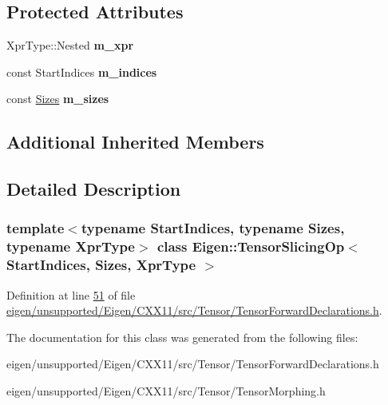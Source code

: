 \subsection*{Protected Attributes}
\begin{DoxyCompactItemize}
\item 
\mbox{\label{class_eigen_1_1_tensor_slicing_op_a1b9219e58825c297a38ff691ccf25f19}} 
Xpr\+Type\+::\+Nested {\bfseries m\+\_\+xpr}
\item 
\mbox{\label{class_eigen_1_1_tensor_slicing_op_aa86bbe34ddd025479333acaba9caa8b1}} 
const Start\+Indices {\bfseries m\+\_\+indices}
\item 
\mbox{\label{class_eigen_1_1_tensor_slicing_op_a40b631158a603533c53311e91207161f}} 
const \hyperlink{struct_eigen_1_1_sizes}{Sizes} {\bfseries m\+\_\+sizes}
\end{DoxyCompactItemize}
\subsection*{Additional Inherited Members}


\subsection{Detailed Description}
\subsubsection*{template$<$typename Start\+Indices, typename Sizes, typename Xpr\+Type$>$\newline
class Eigen\+::\+Tensor\+Slicing\+Op$<$ Start\+Indices, Sizes, Xpr\+Type $>$}



Definition at line \hyperlink{eigen_2unsupported_2_eigen_2_c_x_x11_2src_2_tensor_2_tensor_forward_declarations_8h_source_l00051}{51} of file \hyperlink{eigen_2unsupported_2_eigen_2_c_x_x11_2src_2_tensor_2_tensor_forward_declarations_8h_source}{eigen/unsupported/\+Eigen/\+C\+X\+X11/src/\+Tensor/\+Tensor\+Forward\+Declarations.\+h}.



The documentation for this class was generated from the following files\+:\begin{DoxyCompactItemize}
\item 
eigen/unsupported/\+Eigen/\+C\+X\+X11/src/\+Tensor/\+Tensor\+Forward\+Declarations.\+h\item 
eigen/unsupported/\+Eigen/\+C\+X\+X11/src/\+Tensor/\+Tensor\+Morphing.\+h\end{DoxyCompactItemize}
